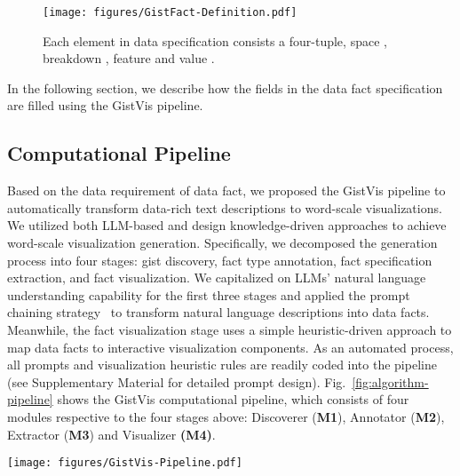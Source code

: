 \begin{figure}[tb]
  \centering
  \texttt{[image: figures/GistFact-Definition.pdf]}
  \caption{Each element in data specification consists a four-tuple, space , breakdown , feature  and value .}
  \label{fig:dataspec-tableview}
\end{figure}

In the following section, we describe how the fields in the data fact specification are filled using the GistVis pipeline.

\subsection{Computational Pipeline}
\label{sec:computational-pipeline}
Based on the data requirement of data fact, we proposed the GistVis pipeline to automatically transform data-rich text descriptions to word-scale visualizations. We utilized both LLM-based and design knowledge-driven approaches to achieve word-scale visualization generation. Specifically, we decomposed the generation process into four stages: gist discovery, fact type annotation, fact specification extraction, and fact visualization. We capitalized on LLMs' natural language understanding capability for the first three stages and applied the prompt chaining strategy~\cite{wu2022ai} to transform natural language descriptions into data facts. Meanwhile, the fact visualization stage uses a simple heuristic-driven approach to map data facts to interactive visualization components. As an automated process, all prompts and visualization heuristic rules are readily coded into the pipeline (see Supplementary Material for detailed prompt design). Fig.~\ref{fig:algorithm-pipeline} shows the GistVis computational pipeline, which consists of four modules respective to the four stages above: Discoverer (\textbf{M1}), Annotator (\textbf{M2}), Extractor (\textbf{M3}) and Visualizer \textbf{(M4)}.

\begin{figure*}
    \texttt{[image: figures/GistVis-Pipeline.pdf]}
    \caption{The GistVis pipeline consists of four modules: Discoverer (\textbf{M1}), Annotator (\textbf{M2}), Extractor (\textbf{M3}), and Visualizer (\textbf{M4}). Data flows through the four modules sequentially, where a large language model captures the insight of the data-rich document (\textbf{M1-M3}). Visualizer (\textbf{M4}) maps the captured insight into interactive visualizations, populated in situ in the text document at word scale.}
    \label{fig:algorithm-pipeline}
\end{figure*}

